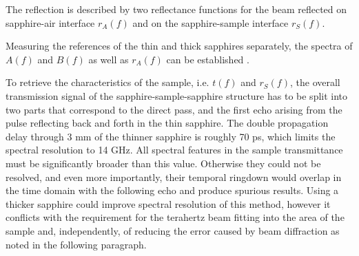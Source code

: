 The reflection is described by two reflectance functions for the beam reflected on sapphire-air interface $r_{A}(f)$ and on the sapphire-sample interface $r_S(f)$.

Measuring the references of the thin and thick sapphires separately, the spectra of $A(f)$ and $B(f)$ as well as $r_{A}(f)$ can be established \cite{nemec2012resonant}. 


To retrieve the characteristics of the sample, i.e. $t(f)$ and $r_S(f)$, the overall transmission signal of the sapphire-sample-sapphire structure has to be split into two parts that correspond to the direct pass, and the first echo arising from the pulse reflecting back and forth  in the thin sapphire.
The double propagation delay through 3 mm of the thinner sapphire is roughly 70 ps, which limits the spectral resolution to 14 GHz. All spectral features in the sample transmittance must be significantly broader than this value. Otherwise they could not be resolved, and even more importantly, their temporal ringdown would overlap in the time domain with the following echo and produce spurious results. Using a thicker sapphire could improve spectral resolution of this method, however it conflicts with the requirement for the terahertz beam fitting into the area of the sample \cite{nemec2009tunable} and, independently, of reducing the error caused by beam diffraction as noted in the following paragraph.

